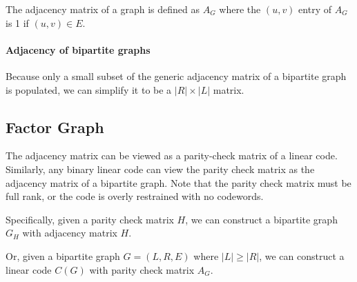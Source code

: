 \documentclass{idc_msc}
\begin{document}
The adjacency matrix of a graph is defined as \(A_G\) where the \((u,v)\) entry of \(A_G\) is 1 if \((u,v) \in E\).

\paragraph{Adjacency of bipartite graphs}

Because only a small subset of the generic adjacency matrix of a bipartite graph is populated, we can simplify it to be a \(|R| \times |L|\) matrix.


\begin{center}
\end{center}

\subsection{Factor Graph}

The adjacency matrix can be viewed as a parity-check matrix of a linear code.
Similarly, any binary linear code can view the parity check matrix as the adjacency matrix of a bipartite graph.
Note that the parity check matrix must be full rank, or the code is overly restrained with no codewords.

Specifically, given a parity check matrix \(H\), we can construct a bipartite graph \(G_H\) with adjacency matrix \(H\).

Or, given a bipartite graph \(G = (L, R, E)\) where \(|L| \ge |R|\), we can construct a linear code \(C(G)\) with parity check matrix \(A_G\).
\end{document}
